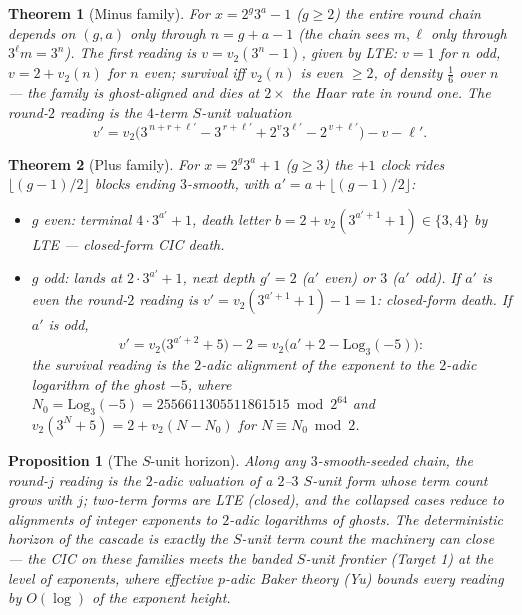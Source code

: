 \documentclass[11pt]{article}
\newtheorem{theorem}{Theorem}
\newtheorem{proposition}{Proposition}
\newcommand{\vt}{v_2}
\begin{document}
\begin{theorem}[Minus family]\label{thm:minus}
For $x=2^g3^a-1$ ($g\ge2$) the entire round chain depends on $(g,a)$
only through $n=g+a-1$ (the chain sees $m,\ell$ only through
$3^\ell m=3^n$). The first reading is $v=\vt(3^n-1)$, given by LTE:
$v=1$ for $n$ odd, $v=2+\vt(n)$ for $n$ even; survival iff $\vt(n)$
is even $\ge2$, of density $\tfrac16$ over $n$ --- the family is
ghost-aligned and dies at $2\times$ the Haar rate in round one. The
round-$2$ reading is the $4$-term $S$-unit valuation
\[
v'=\vt\bigl(3^{\,n+r+\ell'}-3^{\,r+\ell'}+2^{v}3^{\ell'}-2^{\,v+\ell'}\bigr)
-v-\ell' .
\]
\end{theorem}

\begin{theorem}[Plus family]\label{thm:plus}
For $x=2^g3^a+1$ ($g\ge3$) the $+1$ clock rides
$\lfloor(g-1)/2\rfloor$ blocks ending $3$-smooth, with
$a'=a+\lfloor(g-1)/2\rfloor$:
\begin{itemize}
\item[(i)] $g$ even: terminal $4\cdot3^{a'}+1$, death letter
$b=2+\vt(3^{a'+1}+1)\in\{3,4\}$ by LTE --- closed-form CIC death.
\item[(ii)] $g$ odd: lands at $2\cdot3^{a'}+1$, next depth $g'=2$
($a'$ even) or $3$ ($a'$ odd). If $a'$ is even the round-$2$ reading
is $v'=\vt(3^{a'+1}+1)-1=1$: closed-form death. If $a'$ is odd,
\[
v'=\vt\bigl(3^{a'+2}+5\bigr)-2
=\vt\bigl(a'+2-\mathrm{Log}_3(-5)\bigr):
\]
\emph{the survival reading is the $2$-adic alignment of the exponent
to the $2$-adic logarithm of the ghost $-5$}, where
$N_0=\mathrm{Log}_3(-5)=2556611305511861515 \bmod 2^{64}$ and
$\vt(3^N+5)=2+\vt(N-N_0)$ for $N\equiv N_0\bmod2$.
\end{itemize}
\end{theorem}

\begin{proposition}[The $S$-unit horizon]\label{prop:horizon}
Along any $3$-smooth-seeded chain, the round-$j$ reading is the
$2$-adic valuation of a $2$--$3$ $S$-unit form whose term count grows
with $j$; two-term forms are LTE (closed), and the collapsed cases
reduce to alignments of integer exponents to $2$-adic logarithms of
ghosts. The deterministic horizon of the cascade is exactly the
$S$-unit term count the machinery can close --- the CIC on these
families meets the banded $S$-unit frontier (Target 1) at the level of
\emph{exponents}, where effective $p$-adic Baker theory (Yu) bounds
every reading by $O(\log)$ of the exponent height.
\end{proposition}
\end{document}

